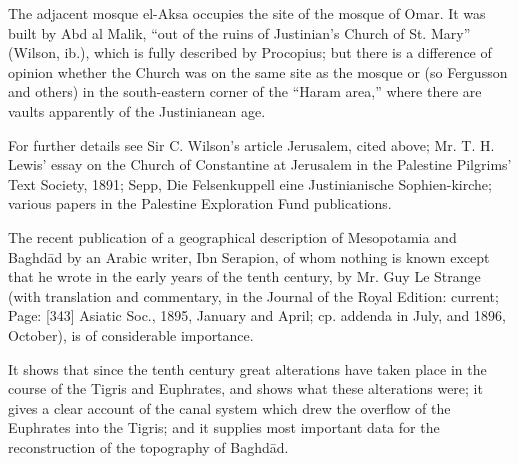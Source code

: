 The adjacent mosque el-Aksa occupies the site of the mosque of Omar. It was built by Abd al Malik, \texthebrew{“}out of the ruins of Justinian\texthebrew{}’s Church of St. Mary\texthebrew{}” (Wilson, ib.), which is fully described by Procopius; but there is a difference of opinion whether the Church was on the same site as the mosque or (so Fergusson and others) in the south-eastern corner of the \texthebrew{“}Haram area,\texthebrew{}” where there are vaults apparently of the Justinianean age.

For further details see Sir C. Wilson\texthebrew{}’s article Jerusalem, cited above; Mr. T. H. Lewis\texthebrew{}’ essay on the Church of Constantine at Jerusalem in the Palestine Pilgrims\texthebrew{}’ Text Society, 1891; Sepp, Die Felsenkuppell eine Justinianische Sophien-kirche; various papers in the Palestine Exploration Fund publications.


The recent publication of a geographical description of Mesopotamia and Baghdād by an Arabic writer, Ibn Serapion, of whom nothing is known except that he wrote in the early years of the tenth century, by Mr. Guy Le Strange (with translation and commentary, in the Journal of the Royal Edition: current; Page: [343] Asiatic Soc., 1895, January and April; cp. addenda in July, and 1896, October), is of considerable importance.

It shows that since the tenth century great alterations have taken place in the course of the Tigris and Euphrates, and shows what these alterations were; it gives a clear account of the canal system which drew the overflow of the Euphrates into the Tigris; and it supplies most important data for the reconstruction of the topography of Baghdād.

